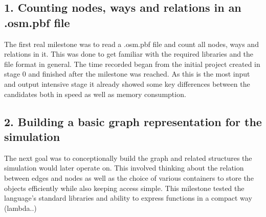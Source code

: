 \subsection*{1. Counting nodes, ways and relations in an .osm.pbf file}
\label{subsec:Approach::Implementation::Counting}

The first real milestone was to read a .osm.pbf file and count all nodes, ways and relations in it. This was done to get familiar with the required libraries and the file format in general. The time recorded began from the initial project created in stage 0 and finished after the milestone was reached. As this is the most input and output intensive stage it already showed some key differences between the candidates both in speed as well as memory consumption.

\subsection*{2. Building a basic graph representation for the simulation}
\label{subsec:Approach::Implementation::Graph_Representation}

The next goal was to conceptionally build the graph and related structures the simulation would later operate on. This involved thinking about the relation between edges and nodes as well as the choice of various containers to store the objects efficiently while also keeping access simple. This milestone tested the language's standard libraries and ability to express functions in a compact way (lambda..)

